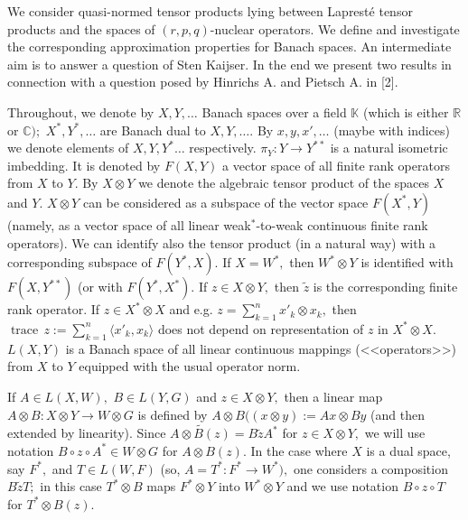 


\vzmscaption


We consider quasi-normed tensor products lying between
Laprest\'e tensor products and the spaces of $(r,p,q)$-nuclear ope\-rators.
We define and investigate the corresponding approxima\-tion pro\-per\-ties for Banach spaces.
An intermediate aim is to answer a question of Sten Kaijser.  In the end we present two results in connection with
a question posed by  Hinrichs A. and Pietsch A. in [2].

Throughout, we denote by $X,Y, \dots$ Banach spaces over a field $\mathbb K$
(which is either $\mathbb R$ or $\mathbb C);$ $X^*, Y^*,\dots$ are
Banach dual to $X, Y, \dots.$ By $x, y, x',\dots$ (maybe with indices) we denote elements of
$X, Y,  Y^*\dots$ respectively. $\pi_Y: Y\to Y^{**}$ is a natural isometric imbedding.
It is denoted by $F(X,Y)$ a vector space of all finite rank operators
from $X$ to $Y.$ By $X\otimes Y$ we denote the algebraic tensor product of the spaces
$X$ and $Y.$
  $X\otimes Y$ can be considered as a subspace of the vector space $F(X^*, Y)$
(namely, as a vector space of all linear weak${^*}$-to-weak continuous
finite rank operators). We can identify also the tensor product (in a natural way)
with a corresponding subspace of $F(Y^*,X).$ If $X=W^*,$ then
$W^*\otimes Y$ is identified with $F(X,Y^{**})$ (or with $F(Y^*,X^*).$
If $z\in X\otimes Y,$ then $\widetilde z$ is the corresponding finite rank operator.
If $z\in X^*\otimes X$ and e.g. $z=\sum_{k=1}^n x'_k\otimes x_k,$ then
   $\operatorname{trace}\, z:= \sum_{k=1}^n \langle x'_k, x_k\rangle$ does not depend on representation
   of $z$ in $X^*\otimes X.$
 $L(X,Y)$ is a Banach space of all linear continuous mappings (<<operators>>)
 from $X$ to $Y$ equipped with the usual operator norm.


  If $A\in L(X,W),$ $B\in L(Y,G)$ and $z\in X\otimes Y,$ then  a linear map
  $A\otimes B: X\otimes Y\to W\otimes G$ is defined by
  $A\otimes B((x\otimes y):= Ax\otimes By$ (and then extended by linearity). Since
 $\widetilde{A\otimes B(z)}= B\widetilde z A^*$ for $z\in X\otimes Y,$ we will use notation
$B\circ z \circ A^*\in W\otimes G$ for $A\otimes B(z).$
In the case where $X$ is a dual space, say $F^*,$ and $T\in L(W,F)$
(so, $A=T^*: F^*\to W^*),$
one considers a composition $B\widetilde z T;$ in this case $T^*\otimes B$ maps
$F^*\otimes Y$ into $W^*\otimes Y$ and
we use notation
$B\circ z\circ T$ for $T^*\otimes B (z).$

